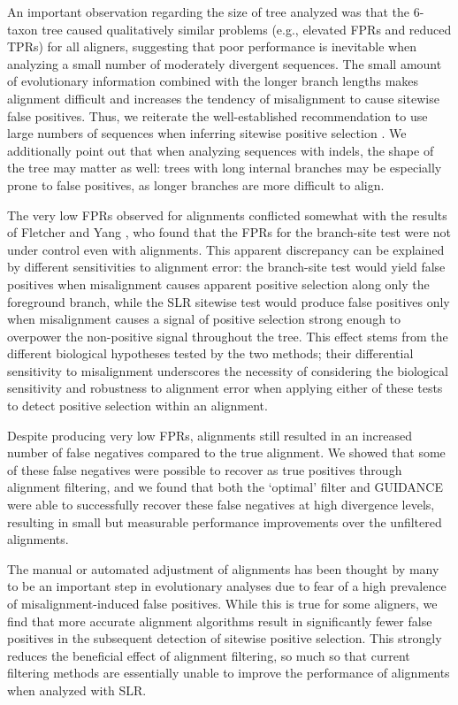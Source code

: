 \documentclass{article}
\begin{document}
An important observation regarding the size of tree analyzed was that
the 6-taxon tree caused qualitatively similar problems (e.g., elevated
FPRs and reduced TPRs) for all aligners, suggesting that poor
performance is inevitable when analyzing a small number of moderately
divergent sequences. The small amount of evolutionary information
combined with the longer branch lengths makes alignment difficult and
increases the tendency of misalignment to cause sitewise false
positives. Thus, we reiterate the well-established recommendation to
use large numbers of sequences when inferring sitewise positive
selection \citep{Anisimova2001Accuracy,Anisimova2002Accuracy}. We
additionally point out that when analyzing sequences with indels, the
shape of the tree may matter as well: trees with long internal
branches may be especially prone to false positives, as longer
branches are more difficult to align.

The very low FPRs observed for \prankc alignments conflicted somewhat
with the results of Fletcher and Yang
\citeyearpar{Fletcher2010Effect}, who found that the FPRs for the
branch-site test were not under control even with \prankc
alignments. This apparent discrepancy can be explained by different
sensitivities to alignment error: the branch-site test would yield
false positives when misalignment causes apparent positive selection
along only the foreground branch, while the SLR sitewise test would produce
false positives only when misalignment causes a signal of positive
selection strong enough to overpower the non-positive signal
throughout the tree. This effect stems from the different biological
hypotheses tested by the two methods; their differential sensitivity
to misalignment underscores the necessity of considering the
biological sensitivity and robustness to alignment error when applying
either of these tests to detect positive selection within an
alignment.

Despite producing very low FPRs, \prankc alignments still resulted in
an increased number of false negatives compared to the true
alignment. We showed that some of these false negatives were possible
to recover as true positives through alignment filtering, and we found
that both the `optimal' filter and GUIDANCE were able to successfully
recover these false negatives at high divergence levels, resulting in
small but measurable performance improvements over the unfiltered
\prankc alignments.

The manual or automated adjustment of alignments has been thought by
many to be an important step in evolutionary analyses due to fear of a
high prevalence of misalignment-induced false positives. While this is
true for some aligners, we find that more accurate alignment
algorithms result in significantly fewer false positives in the
subsequent detection of sitewise positive selection. This strongly
reduces the beneficial effect of alignment filtering, so much so that
current filtering methods are essentially unable to improve the
performance of \prankc alignments when analyzed with SLR.
\end{document}
